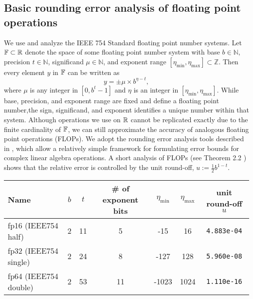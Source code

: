\subsection{Basic rounding error analysis of floating point operations}\label{sec:backgroundRE}
We use and analyze the IEEE 754 Standard floating point number systems.
Let $\mathbb{F} \subset \mathbb{R}$ denote the space of some floating point number system with base $b\in\mathbb{N}$, precision $t\in\mathbb{N}$, significand $\mu\in\mathbb{N}$, and exponent range $[\eta_{\text{min}}, \eta_{\text{max}}]\subset \mathbb{Z}$.
Then every element $y$ in $\mathbb{F}$ can be written as 
\begin{equation}
y = \pm \mu\times b^{\eta-t},
\label{eqn:FPbasic}
\end{equation} 
where $\mu$ is any integer in $[0,b^{t}-1]$ and $\eta$ is an integer in  $[\eta_{\text{min}}, \eta_{\text{max}}]$.
While base, precision, and exponent range are fixed and define a floating point number,the sign, significand, and exponent identifies a unique number within that system.
Although operations we use on $\mathbb{R}$ cannot be replicated exactly due to the finite cardinality of $\mathbb{F}$, we can still approximate the accuracy of analogous floating point operations (FLOPs).
We adopt the rounding error analysis tools described in \cite{Higham2002}, which allow a relatively simple framework for formulating error bounds for complex linear algebra operations. 
A short analysis of FLOPs (see Theorem 2.2 \cite{Higham2002}) shows that the relative error is 
controlled by the unit round-off, $u:=\frac{1}{2}b^{1-t}$. \par 
\vspace{.2cm}
\begin{center}
	\begin{tabular}{||l|c|c|c|c|c|c||} 
		\hline 
		Name & $b$ & $t$ & \# of exponent bits & $\eta_{\text{min}}$ & $\eta_{\text{max}}$ & unit round-off $u$ \\ \hline 
		fp16 (IEEE754 half)& 2 & 11 & 5 & -15 & 16  & {\tt 4.883e-04} \\ \hline 
		fp32 (IEEE754 single)& 2 & 24 & 8 & -127 & 128  & {\tt 5.960e-08} \\ \hline 
		fp64 (IEEE754 double)& 2 & 53 & 11 & -1023 & 1024 & {\tt 1.110e-16} \\ \hline 
	\end{tabular}
\end{center}
\vspace{.2cm}

